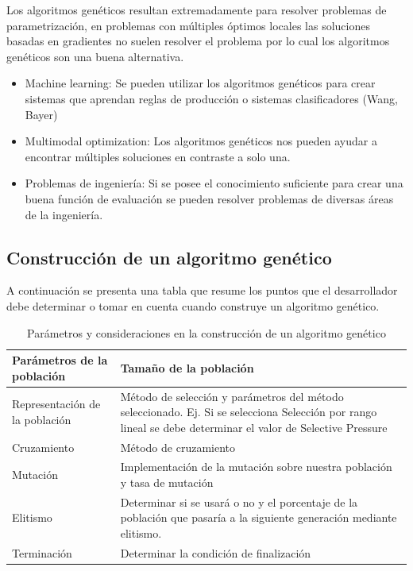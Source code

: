 \documentclass[11pt,fleqn]{book} %
\begin{document}
Los algoritmos genéticos resultan extremadamente para resolver problemas de parametrización, en problemas con múltiples óptimos locales las soluciones basadas en gradientes no suelen resolver el problema por lo cual los algoritmos genéticos son una buena alternativa.
\begin{itemize}
\item Machine learning: Se pueden utilizar los algoritmos genéticos para crear sistemas que aprendan reglas de producción o sistemas clasificadores (Wang, Bayer)
\item Multimodal optimization: Los algoritmos genéticos nos pueden ayudar a encontrar múltiples soluciones en contraste a solo una.
\item Problemas de ingeniería: Si se posee el conocimiento suficiente para crear una buena función de evaluación se pueden resolver problemas de diversas áreas de la ingeniería.
\end{itemize}

\subsection{Construcción de un algoritmo genético} 

A continuación se presenta una tabla que resume los puntos que el desarrollador debe determinar o tomar en cuenta cuando construye un algoritmo genético.

\begin{table}[ht!]
\centering
\caption{Parámetros y consideraciones en la construcción de un algoritmo genético}

\begin{tabular}{|p{5cm}|p{9cm}|}
\hline
	Parámetros de la población & Tamaño de la población\\
\hline
	Representación de la población & Método de selección y parámetros del método seleccionado. Ej. Si se selecciona Selección por rango lineal se debe determinar el valor de Selective Pressure \\
\hline
	Cruzamiento & Método de cruzamiento\\
\hline
	Mutación & Implementación de la mutación sobre nuestra población y  tasa de mutación\\
\hline
	Elitismo & Determinar si se usará o no y el porcentaje de la población que pasaría a la siguiente generación mediante elitismo.\\
\hline
	Terminación & Determinar la condición de finalización\\
\hline

\end{tabular}
\end{table}
\end{document}
